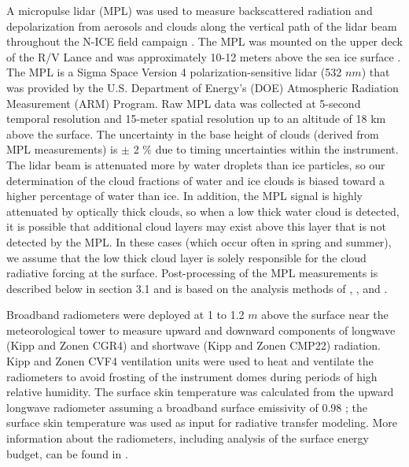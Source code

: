 A micropulse lidar (MPL) was used to measure backscattered radiation and depolarization from aerosols and clouds along the vertical path of the lidar beam throughout the N-ICE field campaign \citep{spinhirne}. The MPL was mounted on the upper deck of the R/V Lance and was approximately 10-12 meters above the sea ice surface \citep{campbell:2002}. The MPL is a Sigma Space Version 4 polarization-sensitive lidar (532 $nm$) that was provided by the U.S. Department of Energy’s (DOE) Atmospheric Radiation Measurement (ARM) Program. Raw MPL data was collected at 5-second temporal resolution and 15-meter spatial resolution up to an altitude of 18 km above the surface. The uncertainty in the base height of clouds (derived from MPL measurements) is $\pm$ 2 $\%$ due to timing uncertainties within the instrument. The lidar beam is attenuated more by water droplets than ice particles, so our determination of the cloud fractions of water and ice clouds is biased toward a higher percentage of water than ice. In addition, the MPL signal is highly attenuated by optically thick clouds, so when a low thick water cloud is detected, it is possible that additional cloud layers may exist above this layer that is not detected by the MPL. In these cases (which occur often in spring and summer), we assume that the low thick cloud layer is solely responsible for the cloud radiative forcing at the surface. Post-processing of the MPL measurements is described below in section 3.1 and is based on the analysis methods of \citet{campbell:2002}, \citet{flynn:2007}, and \citet{stillwell:2018}.

Broadband radiometers were deployed at 1 to 1.2 $m$ above the surface near the meteorological tower to measure upward and downward components of longwave (Kipp and Zonen CGR4) and shortwave (Kipp and Zonen CMP22) radiation. Kipp and Zonen CVF4 ventilation units were used to heat and ventilate the radiometers to avoid frosting of the instrument domes during periods of high relative humidity. The surface skin temperature was calculated from the upward longwave radiometer assuming a broadband surface emissivity of 0.98 \citep{grenfell:1999}; the surface skin temperature was used as input for radiative transfer modeling. More information about the radiometers, including analysis of the surface energy budget, can be found in \citet{walden:2017}.

